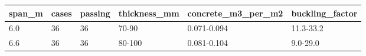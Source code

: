 \begin{tabular}{llllll}
\toprule
span\_m & cases & passing & thickness\_mm & concrete\_m3\_per\_m2 & buckling\_factor \\
\midrule
6.0 & 36 & 36 & 70-90 & 0.071-0.094 & 11.3-33.2 \\
6.6 & 36 & 36 & 80-100 & 0.081-0.104 & 9.0-29.0 \\
\bottomrule
\end{tabular}
